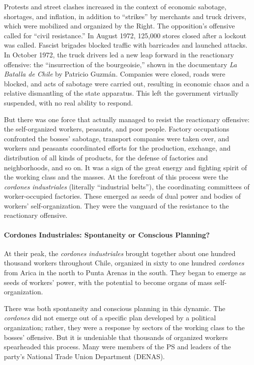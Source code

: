 Protests and street clashes increased in the context of economic sabotage, shortages, and inflation, in addition to ``strikes'' by merchants and truck drivers, which were mobilized and organized by the Right. The opposition's offensive called for ``civil resistance.'' In August 1972, 125,000 stores closed after a lockout was called. Fascist brigades blocked traffic with barricades and launched attacks. In October 1972, the truck drivers led a new leap forward in the reactionary offensive: the ``insurrection of the bourgeoisie,'' shown in the documentary \emph{La Batalla de Chile} by Patricio Guzm\'{a}n. Companies were closed, roads were blocked, and acts of sabotage were carried out, resulting in economic chaos and a relative dismantling of the state apparatus. This left the government virtually suspended, with no real ability to respond.

But there was one force that actually managed to resist the reactionary offensive: the self-organized workers, peasants, and poor people. Factory occupations confronted the bosses' sabotage, transport companies were taken over, and workers and peasants coordinated efforts for the production, exchange, and distribution of all kinds of products, for the defense of factories and neighborhoods, and so on. It was a sign of the great energy and fighting spirit of the working class and the masses. At the forefront of this process were the \emph{cordones industriales} (literally ``industrial belts''), the coordinating committees of worker-occupied factories. These emerged as seeds of dual power and bodies of workers' self-organization. They were the vanguard of the resistance to the reactionary offensive.

\paragraph{Cordones Industriales: Spontaneity or Conscious Planning?}

At their peak, the \emph{cordones industriales} brought together about one hundred thousand workers throughout Chile, organized in sixty to one hundred \emph{cordones} from Arica in the north to Punta Arenas in the south. They began to emerge as seeds of workers' power, with the potential to become organs of mass self-organization.

There was both spontaneity and conscious planning in this dynamic. The \emph{cordones} did not emerge out of a specific plan developed by a political organization; rather, they were a response by sectors of the working class to the bosses' offensive. But it is undeniable that thousands of organized workers spearheaded this process. Many were members of the PS and leaders of the party's National Trade Union Department (DENAS).

